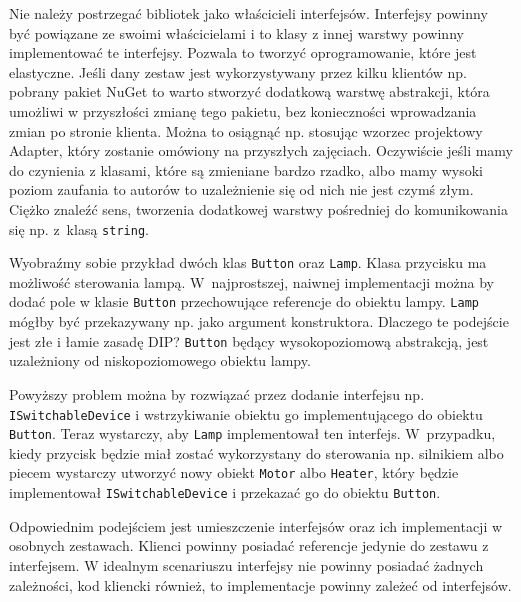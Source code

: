 Nie należy postrzegać bibliotek jako właścicieli interfejsów. Interfejsy powinny być powiązane ze swoimi właścicielami i to klasy z innej warstwy powinny implementować te interfejsy. Pozwala to tworzyć oprogramowanie, które jest elastyczne. Jeśli dany zestaw jest wykorzystywany przez kilku klientów np. pobrany pakiet NuGet to warto stworzyć dodatkową warstwę abstrakcji, która umożliwi w przyszłości zmianę tego pakietu, bez konieczności wprowadzania zmian po stronie klienta. Można to osiągnąć np. stosując wzorzec projektowy Adapter, który zostanie omówiony na przyszłych zajęciach. Oczywiście jeśli mamy do czynienia z klasami, które są zmieniane bardzo rzadko, albo mamy wysoki poziom zaufania to autorów to uzależnienie się od nich nie jest czymś złym. Ciężko znaleźć sens, tworzenia dodatkowej warstwy pośredniej do komunikowania się np. z~klasą \texttt{string}.

Wyobraźmy sobie przykład dwóch klas \texttt{Button} oraz \texttt{Lamp}. Klasa przycisku ma możliwość sterowania lampą. W~najprostszej, naiwnej implementacji można by dodać pole w klasie \texttt{Button} przechowujące referencje do obiektu lampy. \texttt{Lamp} mógłby być przekazywany np. jako argument konstruktora. Dlaczego te podejście jest złe i łamie zasadę DIP? \texttt{Button} będący wysokopoziomową abstrakcją, jest uzależniony od niskopoziomowego obiektu lampy.

Powyższy problem można by rozwiązać przez dodanie interfejsu np. \texttt{ISwitchableDevice} i wstrzykiwanie obiektu go implementującego do obiektu \texttt{Button}. Teraz wystarczy, aby \texttt{Lamp} implementował ten interfejs. W~przypadku, kiedy przycisk będzie miał zostać wykorzystany do sterowania np. silnikiem albo piecem wystarczy utworzyć nowy obiekt \texttt{Motor} albo \texttt{Heater}, który będzie implementował \texttt{ISwitchableDevice} i przekazać go do obiektu \texttt{Button}.


Odpowiednim podejściem jest umieszczenie interfejsów oraz ich implementacji w osobnych zestawach. Klienci powinny posiadać referencje jedynie do zestawu z interfejsem. W idealnym scenariuszu interfejsy nie powinny posiadać żadnych zależności, kod kliencki również, to implementacje powinny zależeć od interfejsów. 
